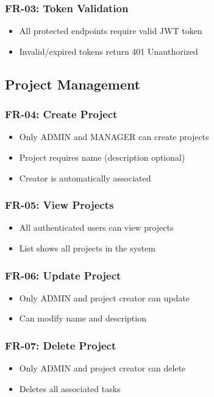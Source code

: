 \documentclass[12pt,a4paper,twoside]{book}
\begin{document}
\subsubsection{FR-03: Token Validation}
\begin{itemize}
    \item All protected endpoints require valid JWT token
    \item Invalid/expired tokens return 401 Unauthorized
\end{itemize}

\subsection{Project Management}

\subsubsection{FR-04: Create Project}
\begin{itemize}
    \item Only ADMIN and MANAGER can create projects
    \item Project requires name (description optional)
    \item Creator is automatically associated
\end{itemize}

\subsubsection{FR-05: View Projects}
\begin{itemize}
    \item All authenticated users can view projects
    \item List shows all projects in the system
\end{itemize}

\subsubsection{FR-06: Update Project}
\begin{itemize}
    \item Only ADMIN and project creator can update
    \item Can modify name and description
\end{itemize}

\subsubsection{FR-07: Delete Project}
\begin{itemize}
    \item Only ADMIN and project creator can delete
    \item Deletes all associated tasks
\end{itemize}
\end{document}
